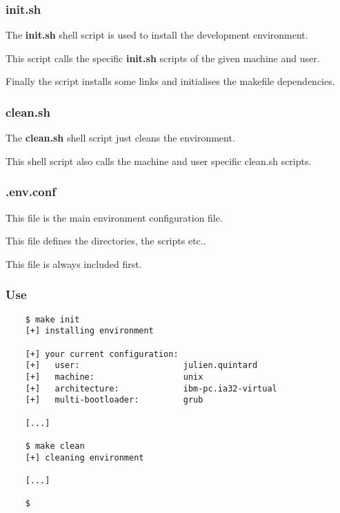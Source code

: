 {%

\begin{frame}
  \frametitle{init.sh}

  The \textbf{init.sh} shell script is used to install the development
  environment.

  \nl

  This script calls the specific \textbf{init.sh} scripts of the given
  machine and user.

  \nl

  Finally the script installs some links and initialises the makefile
  dependencies.
\end{frame}


\begin{frame}
  \frametitle{clean.sh}

  The \textbf{clean.sh} shell script just cleans the environment.

  \nl

  This shell script also calls the machine and user specific clean.sh scripts.
\end{frame}


\begin{frame}
  \frametitle{.env.conf}

  This file is the main environment configuration file.

  \nl

  This file defines the directories, the scripts etc..

  \nl

  This file is always included first.
\end{frame}


\begin{frame}[containsverbatim]
  \frametitle{Use}

  \begin{verbatim}
    $ make init
    [+] installing environment

    [+] your current configuration:
    [+]   user:                     julien.quintard
    [+]   machine:                  unix
    [+]   architecture:             ibm-pc.ia32-virtual
    [+]   multi-bootloader:         grub

    [...]

    $ make clean
    [+] cleaning environment

    [...]

    $
  \end{verbatim}
\end{frame}

}

